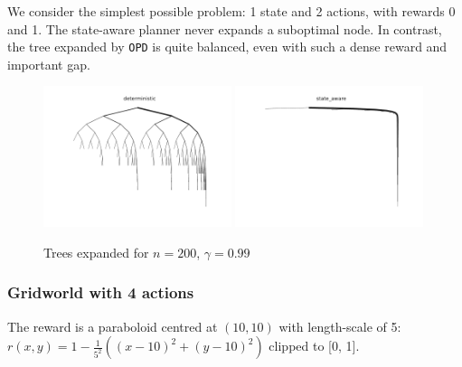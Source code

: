 \documentclass{article}
\begin{document}
We consider the simplest possible problem: 1 state and 2 actions, with rewards 0 and 1. The state-aware planner never expands a suboptimal node. In contrast, the tree expanded by \texttt{OPD} is quite balanced, even with such a dense reward and important gap.
\begin{figure}[H]
    \centering
    \includegraphics[width=0.49\textwidth]{img/bandit_deterministic.pdf}
    \includegraphics[width=0.49\textwidth]{img/bandit_state_aware.pdf}
    \caption{Trees expanded for $n = 200$, $\gamma=0.99$}
    \label{fig:bandit_trees}
\end{figure}

\subsubsection{Gridworld with 4 actions}

The reward is a paraboloid centred at $(10, 10)$ with length-scale of 5:  $r(x, y) = 1 - \frac{1}{5^2}((x-10)^2 + (y-10)^2)$ clipped to [0, 1].
\end{document}
